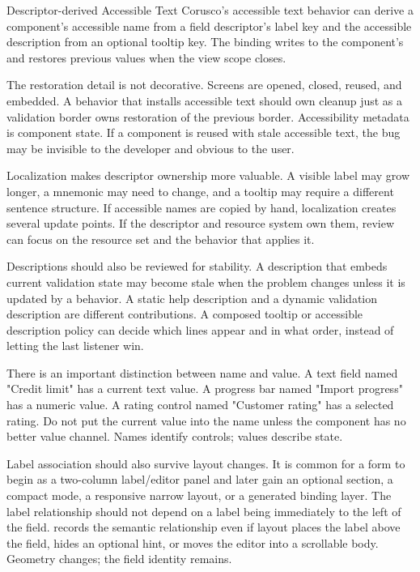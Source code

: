 \begin{coruscobox}{Descriptor-derived Accessible Text}
Corusco's accessible text behavior can derive a component's accessible name from a field descriptor's label key and the accessible description from an optional tooltip key. The binding writes to the component's  and restores previous values when the view scope closes.
\end{coruscobox}

The restoration detail is not decorative. Screens are opened, closed, reused, and embedded. A behavior that installs accessible text should own cleanup just as a validation border owns restoration of the previous border. Accessibility metadata is component state. If a component is reused with stale accessible text, the bug may be invisible to the developer and obvious to the user.

Localization makes descriptor ownership more valuable. A visible label may grow longer, a mnemonic may need to change, and a tooltip may require a different sentence structure. If accessible names are copied by hand, localization creates several update points. If the descriptor and resource system own them, review can focus on the resource set and the behavior that applies it.

Descriptions should also be reviewed for stability. A description that embeds current validation state may become stale when the problem changes unless it is updated by a behavior. A static help description and a dynamic validation description are different contributions. A composed tooltip or accessible description policy can decide which lines appear and in what order, instead of letting the last listener win.

There is an important distinction between name and value. A text field named "Credit limit" has a current text value. A progress bar named "Import progress" has a numeric value. A rating control named "Customer rating" has a selected rating. Do not put the current value into the name unless the component has no better value channel. Names identify controls; values describe state.

Label association should also survive layout changes. It is common for a form
to begin as a two-column label/editor panel and later gain an optional section,
a compact mode, a responsive narrow layout, or a generated binding layer. The
label relationship should not depend on a label being immediately to the left of
the field.  records the semantic relationship even if layout
places the label above the field, hides an optional hint, or moves the editor
into a scrollable body. Geometry changes; the field identity remains.

